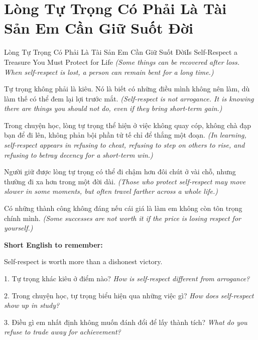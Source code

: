 \section{Lòng Tự Trọng Có Phải Là Tài Sản Em Cần Giữ Suốt Đời}
\begin{truyen}{Lòng Tự Trọng Có Phải Là Tài Sản Em Cần Giữ Suốt Đời}{Is Self-Respect a Treasure You Must Protect for Life}
\textit{(Some things can be recovered after loss. When self-respect is lost, a person can remain bent for a long time.)}

Tự trọng không phải là kiêu. Nó là biết có những điều mình không nên làm, dù làm thế có thể đem lại lợi trước mắt.
\textit{(Self-respect is not arrogance. It is knowing there are things you should not do, even if they bring short-term gain.)}

Trong chuyện học, lòng tự trọng thể hiện ở việc không quay cóp, không chà đạp bạn để đi lên, không phản bội phần tử tế chỉ để thắng một đoạn.
\textit{(In learning, self-respect appears in refusing to cheat, refusing to step on others to rise, and refusing to betray decency for a short-term win.)}

Người giữ được lòng tự trọng có thể đi chậm hơn đôi chút ở vài chỗ, nhưng thường đi xa hơn trong một đời dài.
\textit{(Those who protect self-respect may move slower in some moments, but often travel farther across a whole life.)}
\end{truyen}

\begin{baihoc}
Có những thành công không đáng nếu cái giá là làm em không còn tôn trọng chính mình.
\textit{(Some successes are not worth it if the price is losing respect for yourself.)}
\end{baihoc}

\begin{ghinhoanh}
\textbf{Short English to remember:}

Self-respect is worth more than a dishonest victory.

\end{ghinhoanh}

\begin{tuhocnhanh}
1. Tự trọng khác kiêu ở điểm nào? \textit{How is self-respect different from arrogance?}

2. Trong chuyện học, tự trọng biểu hiện qua những việc gì? \textit{How does self-respect show up in study?}

3. Điều gì em nhất định không muốn đánh đổi để lấy thành tích? \textit{What do you refuse to trade away for achievement?}
\end{tuhocnhanh}
\ngancach
